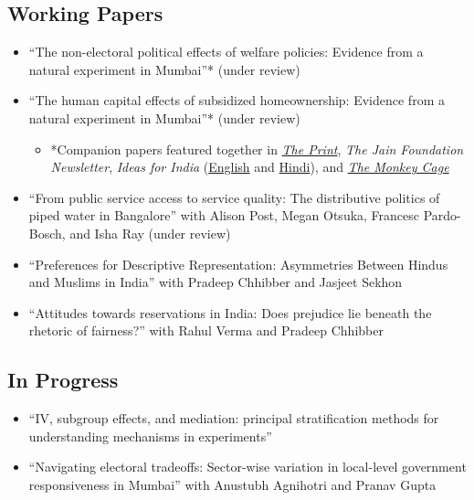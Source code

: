 \documentclass[11pt]{article}
\begin{document}
\subsection*{Working Papers}

\begin{itemize}
	\item[]``The non-electoral political effects of welfare policies: Evidence from a natural experiment in Mumbai''* (under review)
	\item[]``The human capital effects of subsidized homeownership: Evidence from a natural experiment in Mumbai''* (under review)
	\begin{itemize}
	\item[]*Companion papers featured together in \href{https://theprint.in/opinion/mumbai-residents-win-govt-housing-lottery-and-spend-more-on-kids-education-jobs-study/290485/}{\textit{The Print}}, \textit{The Jain Foundation Newsletter}, \textit{Ideas for India} (\href{https://www.ideasforindia.in/topics/poverty-inequality/household-level-effects-of-affordable-housing-evidence-from-mumbai.html}{English} and \href{https://www.ideasforindia.in/topics/poverty-inequality/household-level-effects-of-affordable-housing-evidence-from-mumbai-hindi.html}{Hindi}), and \href{https://www.washingtonpost.com/news/monkey-cage/wp/2019/01/31/heres-what-gavin-newsom-elizabeth-warren-and-microsoft-should-know-if-want-to-end-the-affordable-housing-crisis/?tid=sm_tw_cage}{\textit{The Monkey Cage}}
	\end{itemize} 	
	
		\item[]``From public service access to service quality: The distributive politics of piped water in Bangalore'' with Alison Post, Megan Otsuka, Francesc Pardo-Bosch, and Isha Ray (under review)
	
		\item[]``Preferences for Descriptive Representation: Asymmetries Between Hindus and Muslims in India'' with Pradeep Chhibber and Jasjeet Sekhon 
		\item[]``Attitudes towards reservations in India: Does prejudice lie beneath the rhetoric of fairness?'' with Rahul Verma and Pradeep Chhibber
		\end{itemize}

\subsection*{In Progress}
\begin{itemize}

	\item[]``IV, subgroup effects, and mediation: principal stratification methods for understanding mechanisms in experiments'' 
		\item[]``Navigating electoral tradeoffs: Sector-wise variation in local-level government responsiveness in Mumbai'' with Anustubh Agnihotri and Pranav Gupta


	\end{itemize}
\vspace{3mm}
\end{document}

